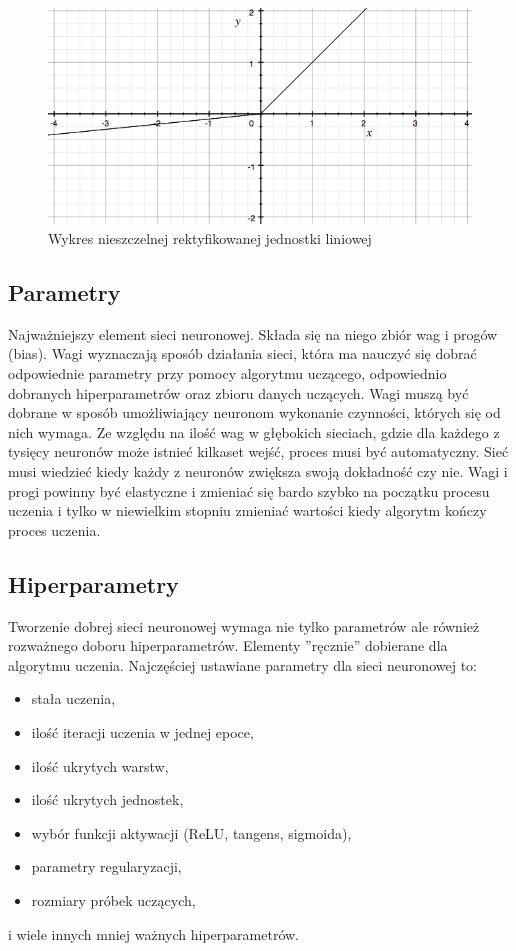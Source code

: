 \documentclass[12pt,a4paper,twoside,titlepage,openright]{book}
\begin{document}
\begin{figure}[ht]
	\centering
			\includegraphics[resolution=100, scale=0.8]{leakyReLU.png}
		\caption{Wykres nieszczelnej rektyfikowanej jednostki liniowej}
\end{figure}

\subsection{Parametry}
Najważniejszy element sieci neuronowej. Składa się na niego zbiór wag i progów (bias). Wagi wyznaczają sposób działania sieci, która ma nauczyć się dobrać odpowiednie parametry przy pomocy algorytmu uczącego, odpowiednio dobranych hiperparametrów oraz zbioru danych uczących. Wagi muszą być dobrane w sposób umożliwiający neuronom wykonanie czynności, których się od nich wymaga. Ze względu na ilość wag w głębokich sieciach, gdzie dla każdego z tysięcy neuronów może istnieć kilkaset wejść, proces musi być automatyczny. Sieć musi wiedzieć kiedy każdy z neuronów zwiększa swoją dokładność czy nie. Wagi i progi powinny być elastyczne i zmieniać się bardo szybko na początku procesu uczenia i tylko w niewielkim stopniu zmieniać wartości kiedy algorytm kończy proces uczenia.

\subsection{Hiperparametry}
Tworzenie dobrej sieci neuronowej wymaga nie tylko parametrów ale również rozważnego doboru hiperparametrów. Elementy ''ręcznie'' dobierane dla algorytmu uczenia. Najczęściej ustawiane parametry dla sieci neuronowej to:
\begin{itemize}
\item stała uczenia,
\item ilość iteracji uczenia w jednej epoce,
\item ilość ukrytych warstw,
\item ilość ukrytych jednostek,
\item wybór funkcji aktywacji (ReLU, tangens, sigmoida),
\item parametry regularyzacji,
\item rozmiary próbek uczących,
\end{itemize}
i wiele innych mniej ważnych hiperparametrów.
\end{document}

